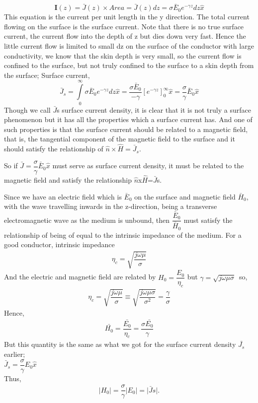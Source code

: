 \begin{dmath}
\textbf{I}(z)=\bar{J}(z)\times Area 
=\bar{J}(z)dz 
=\sigma\bar{E}_0e^{-\gamma z}dz \hat{x}
\end{dmath}
This equation is the current per unit length in the y direction. The total current flowing on the surface is the surface current. Note that there is no true surface current, the current flow into the depth of z but dies down very fast. Hence the little current flow is limited to small dz on the surface of the conductor with large conductivity, we know that the skin depth is very small, so the current flow is confined to the surface, but not truly confined to the surface to a skin depth from the surface;
Surface current,
\begin{dmath}
\bar{J}_s=\int\limits_0^\infty\sigma\bar{E}_0 e^{-\gamma z}dz\hat{x}
=\frac{\sigma\bar{E}_0}{-\gamma}[e^{-\gamma z}]_0^\infty \hat{x}=\frac{\sigma}{\gamma}\bar{E}_0\hat{x}
\end{dmath}
Though we call $\bar{J}$s surface current density, it is clear that it is not truly a surface phenomenon but it has all the properties which a surface current has. And one of such properties is that the surface current should be related to a magnetic field, that is, the tangential component of the magnetic field to the surface and it should satisfy the relationship of $\hat{n}\times\hat{H}=\bar{J}_s$. 

So if 
$\bar{J}=\dfrac{\sigma}{\gamma}\bar{E}_0\hat{x}$ must serve as surface current density, it must be related to the magnetic field and satisfy the relationship $\hat{n}$x$\hat{H}$=$\bar{J}$s.

Since we have an electric field which is $\bar{E}$$_0$ on the surface and magnetic field $\bar{H}$$_0$, with the wave travelling inwards in the z-direction, being a transverse electromagnetic wave as the medium is unbound, then $\dfrac{\bar{E}_0}{\bar{H}_0}$ must satisfy the relationship of being of equal to the intrinsic impedance of the medium.
For a good conductor, intrinsic impedance
\begin{align}
\eta_{c}=\sqrt{\dfrac{j\omega\mu}{\sigma}} 
\end{align} 
And the electric and magnetic field are related by $H_0=\dfrac{E_0}{\eta_{c}}$
but $\gamma =\sqrt{j\omega\mu\sigma}$\ so,
\begin{align}
\eta_{c}=\sqrt{\dfrac{j\omega\mu}{\sigma}}\equiv\sqrt{\dfrac{j\omega\mu\sigma}{\sigma^{2}}}=\dfrac{\gamma}{\sigma}
\end{align}
Hence,
\begin{align}
\bar{H_{0}}=\dfrac{\bar{E_0}}{\eta_{c}}=\dfrac{\sigma \bar{E_0}}{\gamma}
\end{align}
But this quantity is the same as what we got for the surface current density $\bar{J_{s}}$ earlier; \\
$\bar{J}_s=\dfrac{\sigma}{\gamma}E_0\hat{x}$ \\
Thus,
\begin{align}
\lvert H_0\rvert=\dfrac{\sigma}{\gamma}\lvert E_0\rvert=\lvert \bar{J}s\rvert.
\end{align}

